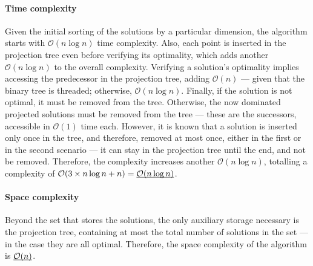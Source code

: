 \paragraph{Time complexity} Given the initial sorting of the solutions by a particular dimension, the algorithm starts with $\mathcal{O}(n\log n)$ time complexity. Also, each point is inserted in the projection tree even before verifying its optimality, which adds another $\mathcal{O}(n\log n)$ to the overall complexity. Verifying a solution's optimality implies accessing the predecessor in the projection tree, adding $\mathcal{O}(n)$ --- given that the binary tree is threaded; otherwise, $\mathcal{O}(n\log n)$. Finally, if the solution is not optimal, it must be removed from the tree. Otherwise, the now dominated projected solutions must be removed from the tree --- these are the successors, accessible in $\mathcal{O}(1)$ time each. However, it is known that a solution is inserted only once in the tree, and therefore, removed at most once, either in the first or in the second scenario --- it can stay in the projection tree until the end, and not be removed. Therefore, the complexity increases another $\mathcal{O}(n\log n)$, totalling a complexity of $\mathcal{O}(3\times n\log n + n) = \underline{\smash{\mathcal{O}(n\log n)}}$.

\paragraph{Space complexity} Beyond the set that stores the solutions, the only auxiliary storage necessary is the projection tree, containing at most the total number of solutions in the set --- in the case they are all optimal. Therefore, the space complexity of the algorithm is $\underline{\smash{\mathcal{O}(n)}}$. 